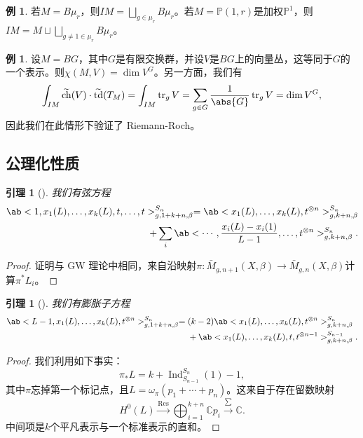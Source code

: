 \documentclass{amsart}
\newtheorem{lem}[thm]{引理}
\theoremstyle{definition}
\newtheorem{exm}[thm]{例}
\theoremstyle{remark}
\theoremstyle{plain}
\theoremstyle{definition}
\theoremstyle{remark}
\newcommand{\C}{\mathbb{C}}
\renewcommand{\P}{\mathbb{P}}
\newcommand{\on}[1]{\operatorname{#1}}
\newcommand{\wt}[1]{\widetilde{#1}}
\newcommand{\1}{\mathbf{1}}
\newcommand{\2}{\mathbf{2}}
\newcommand{\3}{\mathbf{3}}
\begin{document}
\begin{exm}
    若\(M = B\mu_r\)，则\(IM = \bigsqcup_{g \in \mu_r} B \mu_r\)。若\(M = \P(1, r)\)是加权\(\P^1\)，则\(IM = M \sqcup \bigsqcup_{g \neq 1 \in \mu_r} B\mu_r\)。
\end{exm}

\begin{exm}
    设\(M = BG\)，其中\(G\)是有限交换群，并设\(V\)是\(BG\)上的向量丛，这等同于\(G\)的一个表示。则\(\chi(M, V) = \dim V^G\)。另一方面，我们有
    \[ \int_{IM} \wt{\on{ch}}(V) \cdot \wt{\on{td}}(T_M) = \int_{IM} \on{tr}_g V = \sum_{g \in G} \frac{1}{\abs{G}} \on{tr}_g V = \dim V^G, \]
    因此我们在此情形下验证了 Riemann-Roch。
\end{exm}

\subsection{公理化性质}%
\label{sub:Axiomatic properties}

\begin{lem}[{\cite{GiventalK7}}]
    我们有\textit{弦方程}
    \begin{align*}
        \ab< 1, x_1(L), \ldots, x_k(L), t, \ldots, t >_{g, 1+k+n, \beta}^{S_n} = \ab<x_1(L), \ldots, x_k(L), t^{\otimes n}>^{S_n}_{g,k+n,\beta} \\
        + \sum_i \ab< \cdots, \frac{x_i(L) - x_i(1)}{L-1}, \ldots, t^{\otimes n}>^{S_n}_{g,k+n,\beta}. 
    \end{align*}
\end{lem}

\begin{proof}
    证明与 GW 理论中相同，来自沿映射\(\pi \colon\bar{M}_{g,n+1}(X,\beta) \to \bar{M}_{g,n}(X,\beta)\)计算\(\pi^* L_i\)。
\end{proof}

\begin{lem}[{\cite{GiventalK7}}]
    我们有\textit{膨胀子方程}
    \begin{align*}
        \ab<L-1, x_1(L), \ldots, x_k(L), t^{\otimes n}>_{g,1+k+n,\beta}^{S_n} ={}& (k-2)\ab<x_1(L), \ldots, x_k(L), t^{\otimes n}>_{g,k+n,\beta}^{S_n} \\
        &+ \ab<x_1(L), \ldots, x_k(L), t, t^{\otimes n-1}>_{g,k+n,\beta}^{S_{n-1}}.
    \end{align*}
\end{lem}

\begin{proof}
    我们利用如下事实：
    \[ \pi_* L = k + \on{Ind}_{S_{n-1}}^{S_n}(1) - 1, \]
    其中\(\pi\)忘掉第一个标记点，且\(L = \omega_{\pi} (p_1 + \cdots + p_n)\)。这来自于存在留数映射
    \[ H^0(L) \xrightarrow{\on{Res}} \bigoplus_{i=1}^{k+n} \C p_i \xrightarrow{\sum} \C. \]
    中间项是\(k\)个平凡表示与一个标准表示的直和。
\end{proof}
\end{document}

